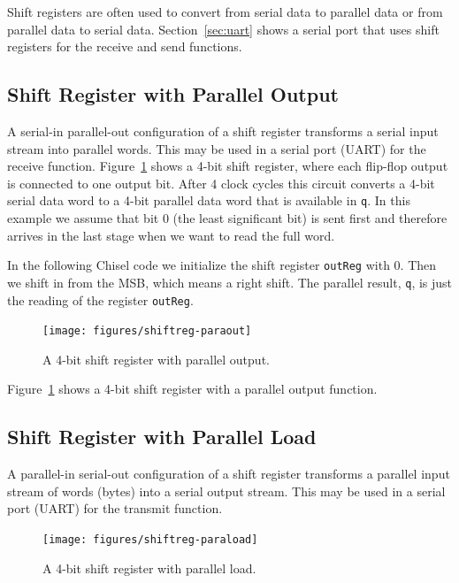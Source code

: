 \documentclass[%
    10pt,
    headinclude, footexclude,
    openright, %
    notitlepage,
    cleardoubleempty,
    headsepline,
    pointlessnumbers,
    bibtotoc, idxtotoc,
    ]{scrbook}
\newcommand{\code}[1]{{\small{\texttt{#1}}}}
\begin{document}
Shift registers are often used to convert from serial data to parallel data or from parallel data
to serial data. Section~\ref{sec:uart} shows a serial port that uses shift registers for the receive and
send functions.

\subsection{Shift Register with Parallel Output}

A serial-in parallel-out configuration of a shift register transforms a serial input stream into parallel
words. This may be used in a serial port (UART) for the receive function.
Figure~\ref{fig:shiftreg-paraout} shows a 4-bit shift register, where each flip-flop output
is connected to one output bit. After 4 clock cycles this circuit converts a 4-bit serial data word
to a 4-bit parallel data word that is available in \code{q}. In this example we assume that bit 0
(the least significant bit) is sent first and therefore arrives in the last stage when we want to read
the full word.

In the following Chisel code we initialize the shift register \code{outReg} with 0. Then we shift in from the
MSB, which means a right shift. The parallel result, \code{q}, is just the reading of the register
\code{outReg}.


\begin{figure}
  \centering
  \texttt{[image: figures/shiftreg-paraout]}
  \caption{A 4-bit shift register with parallel output.}
  \label{fig:shiftreg-paraout}
\end{figure}

\noindent Figure~\ref{fig:shiftreg-paraout} shows a 4-bit shift register with a parallel output function.

\subsection{Shift Register with Parallel Load}

A parallel-in serial-out configuration of a shift register transforms a parallel input stream of words (bytes)
into a serial output stream.
This may be used in a serial port (UART) for the transmit function.

\begin{figure}
  \centering
  \texttt{[image: figures/shiftreg-paraload]}
  \caption{A 4-bit shift register with parallel load.}
  \label{fig:shiftreg-paraload}
\end{figure}
\end{document}
